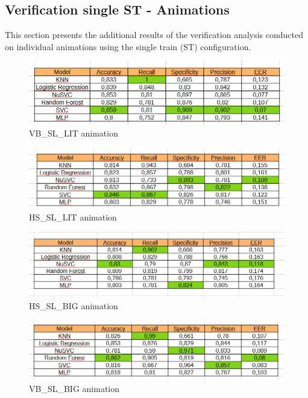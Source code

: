 \documentclass{article}
\begin{document}
\subsection{Verification single ST - Animations}
\label{subsec:vs_st_a}

This section presents the additional results of the verification analysis conducted on individual animations using the single train (ST) configuration.

\begin{figure}[ht]
    \centering
    \includegraphics[width = 0.8
    \textwidth]{Images/Results/Verification_single/st/VB_SL_LIT.png}
    \caption{VB\_SL\_LIT animation}
    \label{fig:VB_SL_LIT_st}
\end{figure}

\begin{figure}[ht]
    \centering
    \includegraphics[width = 0.8
    \textwidth]{Images/Results/Verification_single/st/HS_SL_LIT.png}
    \caption{HS\_SL\_LIT animation}
    \label{fig:HS_SL_LIT_st}
\end{figure}

\begin{figure}[ht]
    \centering
    \includegraphics[width = 0.8
    \textwidth]{Images/Results/Verification_single/st/HS_SL_BIG.png}
    \caption{HS\_SL\_BIG animation}
    \label{fig:HS_SL_BIG_st}
\end{figure}

\begin{figure}[ht]
    \centering
    \includegraphics[width = 0.8
    \textwidth]{Images/Results/Verification_single/st/VB_SL_BIG.png}
    \caption{VB\_SL\_BIG animation}
    \label{fig:VB_SL_BIG_st}
\end{figure}
\end{document}

